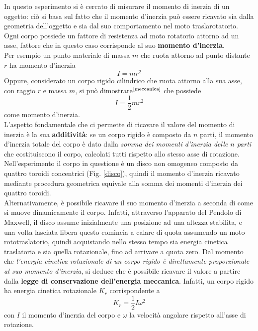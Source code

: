 In questo esperimento si è cercato di misurare il momento di inerzia di un oggetto: ciò si basa sul fatto che il momento d'inerzia può essere ricavato sia dalla geometria dell'oggetto e sia dal suo comportamento nel moto traslarotatorio.
Ogni corpo possiede un fattore di resistenza ad moto rotatorio attorno ad un asse, fattore che in questo caso corrisponde al suo \textbf{momento d'inerzia}.\\
Per esempio un punto materiale di massa $m$ che ruota attorno ad punto distante $r$ ha momento d'inerzia 
$$I = m r^2$$
Oppure, considerato un corpo rigido cilindrico che ruota attorno alla sua asse, con raggio $r$ e massa $m$, si può dimostrare$^{\textrm{\cite{meccanica}}}$ che possiede
$$I =  \frac{1}{2} m r^2$$
come momento d'inerzia.\\
L'aspetto fondamentale che ci permette di ricavare il valore del momento di inerzia è la sua \textbf{additività}: se un corpo rigido è composto da $n$ parti, il momento d'inerzia totale del corpo  è dato dalla \textit{somma dei momenti d'inerzia delle $n$ parti} che costituiscono il corpo, calcolati tutti rispetto allo stesso asse di rotazione.\\
Nell'esperimento il corpo in questione è un disco non omogeneo composto da quattro toroidi concentrici (Fig. \ref{disco}), quindi il momento d'inerzia ricavato mediante procedura geometrica equivale alla somma dei momenti d'inerzia dei quattro toroidi.\\

Alternativamente, è possibile ricavare il suo momento d'inerzia a seconda di come si muove dinamicamente il corpo. Infatti, attraverso l'apparato del Pendolo di Maxwell, il disco assume inizialmente una posizione ad una altezza stabilita, e una volta lasciata libera questo comincia a calare di quota assumendo un moto rototraslatorio, quindi acquistando nello stesso tempo sia energia cinetica traslatoria e sia quella rotazionale, fino ad arrivare a quota zero. Dal momento che \textit{l'energia cinetica rotazionale di un corpo rigido è direttamente proporzionale al suo momento d'inerzia}, si deduce che è possibile ricavare il valore a partire dalla \textbf{legge di conservazione dell'energia meccanica}. Infatti, un corpo rigido ha energia cinetica rotazionale $K_r$ corrispondente a
$$\displaystyle K_r = \frac{1}{2} I \omega ^2$$
con $I$ il momento d'inerzia del corpo e $\omega$ la velocità angolare rispetto all'asse di rotazione.
